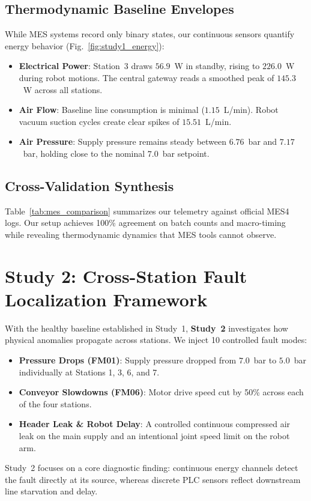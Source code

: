\documentclass[journal]{IEEEtran}
\begin{document}
\subsection{Thermodynamic Baseline Envelopes}
While MES systems record only binary states, our continuous sensors quantify energy behavior (Fig.~\ref{fig:study1_energy}):
\begin{itemize}
    \item \textbf{Electrical Power}: Station~3 draws $56.9$~W in standby, rising to $226.0$~W during robot motions. The central gateway reads a smoothed peak of $145.3$~W across all stations.
    \item \textbf{Air Flow}: Baseline line consumption is minimal ($1.15$~L/min). Robot vacuum suction cycles create clear spikes of $15.51$~L/min.
    \item \textbf{Air Pressure}: Supply pressure remains steady between $6.76$~bar and $7.17$~bar, holding close to the nominal $7.0$~bar setpoint.
\end{itemize}

\subsection{Cross-Validation Synthesis}
Table~\ref{tab:mes_comparison} summarizes our telemetry against official MES4 logs. Our setup achieves 100\% agreement on batch counts and macro-timing while revealing thermodynamic dynamics that MES tools cannot observe.

\section{Study 2: Cross-Station Fault Localization Framework}
\label{sec:study2}
With the healthy baseline established in Study~1, \textbf{Study~2} investigates how physical anomalies propagate across stations. We inject 10 controlled fault modes:
\begin{itemize}
    \item \textbf{Pressure Drops (FM01)}: Supply pressure dropped from $7.0$~bar to $5.0$~bar individually at Stations 1, 3, 6, and 7.
    \item \textbf{Conveyor Slowdowns (FM06)}: Motor drive speed cut by 50\% across each of the four stations.
    \item \textbf{Header Leak \& Robot Delay}: A controlled continuous compressed air leak on the main supply and an intentional joint speed limit on the robot arm.
\end{itemize}
Study~2 focuses on a core diagnostic finding: continuous energy channels detect the fault directly at its source, whereas discrete PLC sensors reflect downstream line starvation and delay.
\end{document}
